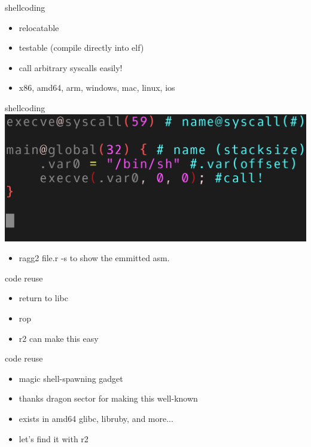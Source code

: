 \documentclass[10pt,pdf,utf8,english,compress,hyperref={unicode}]{beamer}
\begin{document}
\begin{frame}{shellcoding}
	\begin{itemize}
		\item relocatable
		\item testable (compile directly into elf)
		\item call arbitrary syscalls easily!
		\item x86, amd64, arm, windows, mac, linux, ios
	\end{itemize}
\end{frame}

\begin{frame}{shellcoding}
	\includegraphics[width=\textwidth]{crimages/shellcode.png}
	\begin{itemize}
		\item ragg2 file.r -s to show the emmitted asm.
	\end{itemize}
\end{frame}

\begin{frame}{code reuse}
	\begin{itemize}
		\item return to libc
		\item rop
		\item r2 can make this easy
	\end{itemize}
\end{frame}

\begin{frame}{code reuse}
	\begin{itemize}
		\item magic shell-spawning gadget
		\item thanks dragon sector for making this well-known
		\item exists in amd64 glibc, libruby, and more...
		\item let's find it with r2
	\end{itemize}
\end{frame}
\end{document}
